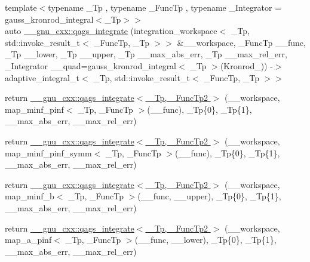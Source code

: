 \begin{DoxyCompactItemize}
\item 
{\footnotesize template$<$typename \+\_\+\+Tp , typename \+\_\+\+Func\+Tp , typename \+\_\+\+Integrator  = gauss\+\_\+kronrod\+\_\+integral$<$\+\_\+\+Tp$>$$>$ }\\auto \hyperlink{namespace____gnu__cxx_afde6c192a4e11d49f4c9c117277980ff}{\+\_\+\+\_\+gnu\+\_\+cxx\+::qags\+\_\+integrate} (integration\+\_\+workspace$<$ \+\_\+\+Tp, std\+::invoke\+\_\+result\+\_\+t$<$ \+\_\+\+Func\+Tp, \+\_\+\+Tp $>$$>$ \&\+\_\+\+\_\+workspace, \+\_\+\+Func\+Tp \+\_\+\+\_\+func, \+\_\+\+Tp \+\_\+\+\_\+lower, \+\_\+\+Tp \+\_\+\+\_\+upper, \+\_\+\+Tp \+\_\+\+\_\+max\+\_\+abs\+\_\+err, \+\_\+\+Tp \+\_\+\+\_\+max\+\_\+rel\+\_\+err, \+\_\+\+Integrator \+\_\+\+\_\+quad=gauss\+\_\+kronrod\+\_\+integral$<$ \+\_\+\+Tp $>$(Kronrod\+\_)) -\/$>$ adaptive\+\_\+integral\+\_\+t$<$ \+\_\+\+Tp, std\+::invoke\+\_\+result\+\_\+t$<$ \+\_\+\+Func\+Tp, \+\_\+\+Tp $>$$>$
\item 
return \hyperlink{namespace____gnu__cxx_a8b6964018d33496542948228e467acb1}{\+\_\+\+\_\+gnu\+\_\+cxx\+::qags\+\_\+integrate$<$ \+\_\+\+Tp, \+\_\+\+Func\+Tp2 $>$} (\+\_\+\+\_\+workspace, map\+\_\+minf\+\_\+pinf$<$ \+\_\+\+Tp, \+\_\+\+Func\+Tp $>$(\+\_\+\+\_\+func), \+\_\+\+Tp\{0\}, \+\_\+\+Tp\{1\}, \+\_\+\+\_\+max\+\_\+abs\+\_\+err, \+\_\+\+\_\+max\+\_\+rel\+\_\+err)
\item 
return \hyperlink{namespace____gnu__cxx_a454f1c38cacdbcfa8076d60f86a5f57d}{\+\_\+\+\_\+gnu\+\_\+cxx\+::qags\+\_\+integrate$<$ \+\_\+\+Tp, \+\_\+\+Func\+Tp2 $>$} (\+\_\+\+\_\+workspace, map\+\_\+minf\+\_\+pinf\+\_\+symm$<$ \+\_\+\+Tp, \+\_\+\+Func\+Tp $>$(\+\_\+\+\_\+func), \+\_\+\+Tp\{0\}, \+\_\+\+Tp\{1\}, \+\_\+\+\_\+max\+\_\+abs\+\_\+err, \+\_\+\+\_\+max\+\_\+rel\+\_\+err)
\item 
return \hyperlink{namespace____gnu__cxx_a82afc5fe73ee3fd1e16fd7b7f126379f}{\+\_\+\+\_\+gnu\+\_\+cxx\+::qags\+\_\+integrate$<$ \+\_\+\+Tp, \+\_\+\+Func\+Tp2 $>$} (\+\_\+\+\_\+workspace, map\+\_\+minf\+\_\+b$<$ \+\_\+\+Tp, \+\_\+\+Func\+Tp $>$(\+\_\+\+\_\+func, \+\_\+\+\_\+upper), \+\_\+\+Tp\{0\}, \+\_\+\+Tp\{1\}, \+\_\+\+\_\+max\+\_\+abs\+\_\+err, \+\_\+\+\_\+max\+\_\+rel\+\_\+err)
\item 
return \hyperlink{namespace____gnu__cxx_ae5530a44e048f341ccc448df258d49d3}{\+\_\+\+\_\+gnu\+\_\+cxx\+::qags\+\_\+integrate$<$ \+\_\+\+Tp, \+\_\+\+Func\+Tp2 $>$} (\+\_\+\+\_\+workspace, map\+\_\+a\+\_\+pinf$<$ \+\_\+\+Tp, \+\_\+\+Func\+Tp $>$(\+\_\+\+\_\+func, \+\_\+\+\_\+lower), \+\_\+\+Tp\{0\}, \+\_\+\+Tp\{1\}, \+\_\+\+\_\+max\+\_\+abs\+\_\+err, \+\_\+\+\_\+max\+\_\+rel\+\_\+err)
\end{DoxyCompactItemize}


